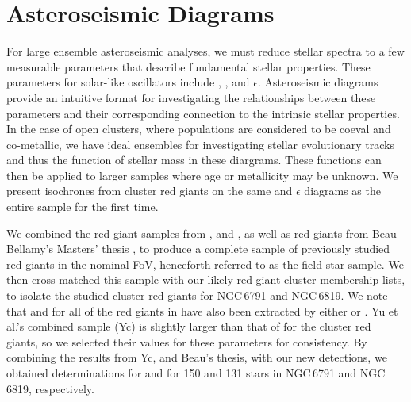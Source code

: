 \section{Asteroseismic Diagrams}

For large ensemble asteroseismic analyses, we must reduce stellar spectra to a few measurable parameters that describe fundamental stellar properties. These parameters for solar-like oscillators include \numax{}, \dnu{}, and $\epsilon$. Asteroseismic diagrams provide an intuitive format for investigating the relationships between these parameters and their corresponding connection to the intrinsic stellar properties. In the case of open clusters, where populations are considered to be coeval and co-metallic, we have ideal ensembles for investigating stellar evolutionary tracks and thus the function of stellar mass in these diargrams. These functions can then be applied to larger samples where age or metallicity may be unknown. We present isochrones from cluster red giants on the same \numax{} \textendash{} \dnu{} and \dnu{} \textendash{} $\epsilon$ diagrams as the entire \Kepler{} sample for the first time.

We combined the red giant samples from \cite{hon_deep_2018}, \cite{yu_asteroseismology_2018-1} and \cite{yu_asteroseismology_2020}, as well as red giants from Beau Bellamy's Masters' thesis \citep{bellamy_using_2015}, to produce a complete sample of previously studied red giants in the nominal \Kepler{} FoV, henceforth referred to as the field star sample. We then cross-matched this sample with our likely red giant cluster membership lists, to isolate the studied cluster red giants for NGC\,6791 and NGC\,6819. We note that \numax{} and \dnu{} for all of the red giants in \cite{hon_deep_2018} have also been extracted by either \cite{yu_asteroseismology_2018-1} or \cite{yu_asteroseismology_2020}. Yu et al.'s combined sample (Yc) is slightly larger than that of \cite{hon_deep_2018} for the cluster red giants, so we selected their values for these parameters for consistency. By combining the results from Yc, and Beau's thesis, with our new detections, we obtained determinations for \numax{} and \dnu{} for 150 and 131 stars in NGC\,6791 and NGC\,6819, respectively.

